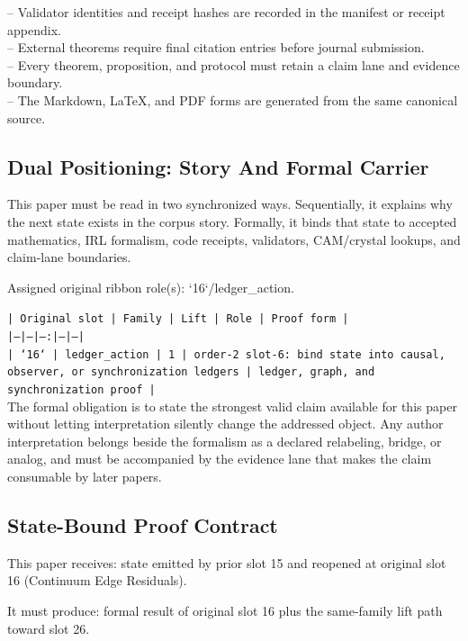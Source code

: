 \documentclass[11pt]{article}
\begin{document}
\noindent{}-- Validator identities and receipt hashes are recorded in the manifest or receipt appendix.\\
\noindent{}-- External theorems require final citation entries before journal submission.\\
\noindent{}-- Every theorem, proposition, and protocol must retain a claim lane and evidence boundary.\\
\noindent{}-- The Markdown, LaTeX, and PDF forms are generated from the same canonical source.\\

\subsection*{Dual Positioning: Story And Formal Carrier}

This paper must be read in two synchronized ways. Sequentially, it explains why
the next state exists in the corpus story. Formally, it binds that state to
accepted mathematics, IRL formalism, code receipts, validators, CAM/crystal
lookups, and claim-lane boundaries.

Assigned original ribbon role(s): `16`/ledger\_action.

\noindent\texttt{| Original slot | Family | Lift | Role | Proof form |}\\
\noindent\texttt{|---|---|---:|---|---|}\\
\noindent\texttt{| `16` | ledger\_action | 1 | order-2 slot-6: bind state into causal, observer, or synchronization ledgers | ledger, graph, and synchronization proof |}\\

The formal obligation is to state the strongest valid claim available for this
paper without letting interpretation silently change the addressed object. Any
author interpretation belongs beside the formalism as a declared relabeling,
bridge, or analog, and must be accompanied by the evidence lane that makes the
claim consumable by later papers.

\subsection*{State-Bound Proof Contract}

This paper receives: state emitted by prior slot 15 and reopened at original slot 16 (Continuum Edge Residuals).

It must produce: formal result of original slot 16 plus the same-family lift path toward slot 26.
\end{document}
